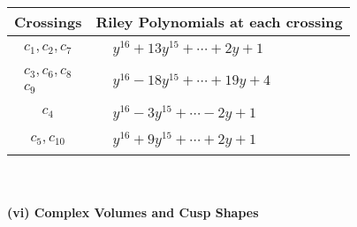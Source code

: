 \documentclass[1p]{elsarticle_modified}
\theoremstyle{definition}
\begin{document}
\begin{tabular}{m{50pt}|m{274pt}}
Crossings & \hspace{64pt}Riley Polynomials at each crossing \\
\hline $$\begin{aligned}c_{1},c_{2},c_{7}\end{aligned}$$&$\begin{aligned}
&y^{16}+13 y^{15}+\cdots+2 y+1
\end{aligned}$\\
\hline $$\begin{aligned}c_{3},c_{6},c_{8}\\c_{9}\end{aligned}$$&$\begin{aligned}
&y^{16}-18 y^{15}+\cdots+19 y+4
\end{aligned}$\\
\hline $$\begin{aligned}c_{4}\end{aligned}$$&$\begin{aligned}
&y^{16}-3 y^{15}+\cdots-2 y+1
\end{aligned}$\\
\hline $$\begin{aligned}c_{5},c_{10}\end{aligned}$$&$\begin{aligned}
&y^{16}+9 y^{15}+\cdots+2 y+1
\end{aligned}$\\
\hline
\end{tabular}\\~\\
\newpage\flushleft \textbf{(vi) Complex Volumes and Cusp Shapes}
\end{document}
